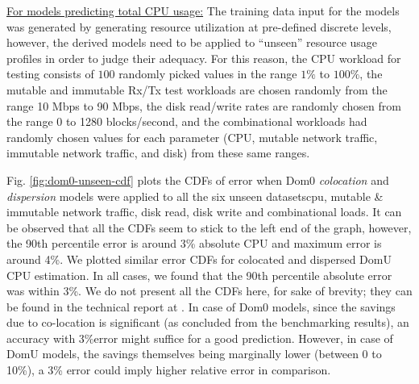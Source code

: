 \underline{For models predicting total CPU usage:}
The training data input for the models was generated
by generating resource utilization at pre-defined discrete 
levels, however, the derived models
need to be applied to ``unseen'' resource usage profiles
in order to judge their adequacy. For this reason, the
CPU workload for testing consists of $100$ randomly
picked values in the range $1\%$
to $100\%$, the mutable and immutable 
Rx/Tx test workloads
are chosen randomly from the range 10 Mbps to 90 Mbps, the
disk read/write rates are randomly chosen from the range
0 to 1280 blocks/second, and the combinational workloads 
had randomly chosen values for each parameter (CPU, mutable
network traffic, immutable network traffic,
and disk) from these same ranges.

Fig. \ref{fig:dom0-unseen-cdf} plots the CDFs of error when
Dom0 \emph{colocation} and \emph{dispersion} models were applied to all the
six unseen datasets\textemdash{}cpu, mutable \& immutable network traffic, disk read,
disk write and combinational loads. It can be observed that
all the CDFs seem to stick to the left end of the graph, however,
the 90th percentile
error is around 3\% absolute CPU and maximum error is around 4\%. 
We plotted similar error
CDFs for colocated and dispersed DomU CPU estimation. In 
all cases, we found that
the 90th percentile absolute error was within 3\%. We do
not present all the CDFs here, for sake of brevity; they can
be found in the technical report at \cite{affine-modeling-tech-report}.
In case of Dom0 models, 
since the savings due to co-location
is significant (as concluded from the benchmarking results), an
accuracy with 3\%error might suffice for a good prediction. However, in
case of DomU models, 
the savings themselves being marginally 
lower (between 0 to 10\%), a 3\% error could imply higher 
relative error in comparison. 


